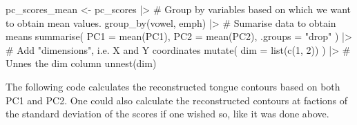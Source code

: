 \documentclass[
  man,
  longtable,
  nolmodern,
  notxfonts,
  notimes,
  colorlinks=true,linkcolor=blue,citecolor=blue,urlcolor=blue]{apa7}
\newenvironment{Shaded}{\begin{snugshade}}{\end{snugshade}}
\newcommand{\AttributeTok}[1]{\textcolor[rgb]{0.40,0.45,0.13}{#1}}
\newcommand{\CommentTok}[1]{\textcolor[rgb]{0.37,0.37,0.37}{#1}}
\newcommand{\DecValTok}[1]{\textcolor[rgb]{0.68,0.00,0.00}{#1}}
\newcommand{\FunctionTok}[1]{\textcolor[rgb]{0.28,0.35,0.67}{#1}}
\newcommand{\NormalTok}[1]{\textcolor[rgb]{0.00,0.23,0.31}{#1}}
\newcommand{\OtherTok}[1]{\textcolor[rgb]{0.00,0.23,0.31}{#1}}
\newcommand{\SpecialCharTok}[1]{\textcolor[rgb]{0.37,0.37,0.37}{#1}}
\newcommand{\StringTok}[1]{\textcolor[rgb]{0.13,0.47,0.30}{#1}}
\begin{document}
\begin{Shaded}
\begin{Highlighting}[]
\NormalTok{pc\_scores\_mean }\OtherTok{\textless{}{-}}\NormalTok{ pc\_scores }\SpecialCharTok{|\textgreater{}}
  \CommentTok{\# Group by variables based on which we want to obtain mean values.}
  \FunctionTok{group\_by}\NormalTok{(vowel, emph) }\SpecialCharTok{|\textgreater{}} 
  \CommentTok{\# Sumarise data to obtain means}
  \FunctionTok{summarise}\NormalTok{(}
    \AttributeTok{PC1 =} \FunctionTok{mean}\NormalTok{(PC1),}
    \AttributeTok{PC2 =} \FunctionTok{mean}\NormalTok{(PC2),}
    \AttributeTok{.groups =} \StringTok{"drop"}
\NormalTok{  ) }\SpecialCharTok{|\textgreater{}} 
  \CommentTok{\# Add "dimensions", i.e. X and Y coordinates}
  \FunctionTok{mutate}\NormalTok{(}
    \AttributeTok{dim =} \FunctionTok{list}\NormalTok{(}\FunctionTok{c}\NormalTok{(}\DecValTok{1}\NormalTok{, }\DecValTok{2}\NormalTok{))}
\NormalTok{  ) }\SpecialCharTok{|\textgreater{}} 
  \CommentTok{\# Unnes the dim column}
  \FunctionTok{unnest}\NormalTok{(dim)}
\end{Highlighting}
\end{Shaded}

The following code calculates the reconstructed tongue contours based on
both PC1 and PC2. One could also calculate the reconstructed contours at
factions of the standard deviation of the scores if one wished so, like
it was done above.
\end{document}
